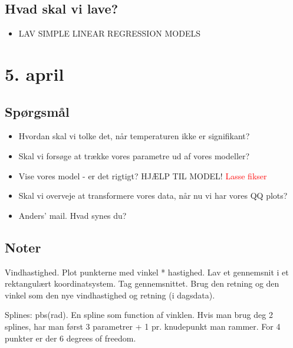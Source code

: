 \subsection{Hvad skal vi lave?}
\begin{itemize}
    \item LAV SIMPLE LINEAR REGRESSION MODELS
\end{itemize}

\pagebreak

\section{5. april}

\subsection{Spørgsmål}
\begin{itemize}
    \item Hvordan skal vi tolke det, når temperaturen ikke er signifikant?
    \item Skal vi forsøge at trække vores parametre ud af vores modeller?
    \item Vise vores model - er det rigtigt? HJÆLP TIL MODEL! \textcolor{red}{Lasse fikser}
    \item Skal vi overveje at transformere vores data, når nu vi har vores QQ plots? 
    \item Anders' mail. Hvad synes du?
\end{itemize}

\subsection{Noter}
Vindhastighed. Plot punkterne med vinkel * hastighed. Lav et gennemsnit i et rektangulært koordinatsystem.
Tag gennemsnittet. Brug den retning og den vinkel som den nye vindhastighed og retning (i dagsdata).

Splines: pbs(rad). En spline som function af vinklen. Hvis man brug deg 2 splines, har man først 3 parametrer + 1 pr. knudepunkt man rammer.
For 4 punkter er der 6 degrees of freedom.

